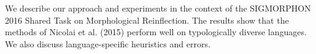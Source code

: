 We describe our approach and experiments in the context of the SIGMORPHON 2016 Shared Task on Morphological Reinflection. The results show that the methods of Nicolai et al. (2015) perform well on typologically diverse languages. We also discuss language-specific heuristics and errors.
